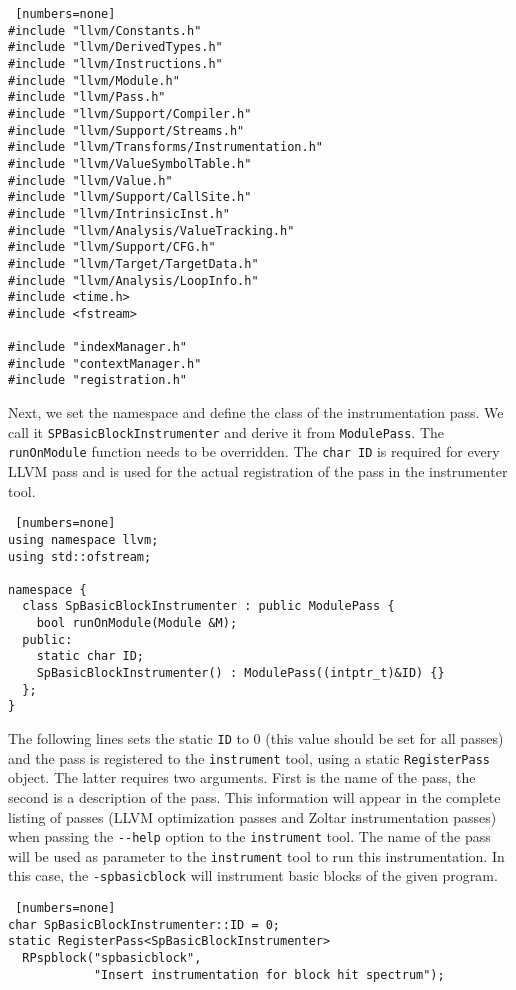 \begin{lstlisting} [numbers=none]
#include "llvm/Constants.h"
#include "llvm/DerivedTypes.h"
#include "llvm/Instructions.h"
#include "llvm/Module.h"
#include "llvm/Pass.h"
#include "llvm/Support/Compiler.h"
#include "llvm/Support/Streams.h"
#include "llvm/Transforms/Instrumentation.h"
#include "llvm/ValueSymbolTable.h"
#include "llvm/Value.h"
#include "llvm/Support/CallSite.h"
#include "llvm/IntrinsicInst.h"
#include "llvm/Analysis/ValueTracking.h"
#include "llvm/Support/CFG.h"
#include "llvm/Target/TargetData.h"
#include "llvm/Analysis/LoopInfo.h"
#include <time.h>
#include <fstream>

#include "indexManager.h"
#include "contextManager.h"
#include "registration.h"
\end{lstlisting}

Next, we set the namespace and define the class of the instrumentation pass.
We call it \texttt{SPBasicBlockInstrumenter} and derive it from \texttt{ModulePass}.
The \texttt{runOnModule} function needs to be overridden.
The \texttt{char ID} is required for every LLVM pass and is used
for the actual registration of the pass in the instrumenter tool.

\begin{lstlisting} [numbers=none]
using namespace llvm;
using std::ofstream;

namespace {
  class SpBasicBlockInstrumenter : public ModulePass {
    bool runOnModule(Module &M);
  public:
    static char ID;
    SpBasicBlockInstrumenter() : ModulePass((intptr_t)&ID) {}
  };
}
\end{lstlisting}

The following lines sets the static \verb|ID| to 0 (this value should be set for all passes)
and the pass is registered to the \texttt{instrument} tool, 
using a static \texttt{RegisterPass} object.
The latter requires two arguments.
First is the name of the pass,
the second is a description of the pass.
This information will appear in the complete listing of passes
(LLVM optimization passes and Zoltar instrumentation passes)
when passing the \verb|--help| option to the \texttt{instrument} tool.
The name of the pass will be used as parameter to the
\verb|instrument| tool to run this instrumentation.
In this case, the \texttt{-spbasicblock} will instrument
basic blocks of the given program.

\begin{lstlisting} [numbers=none]
char SpBasicBlockInstrumenter::ID = 0;
static RegisterPass<SpBasicBlockInstrumenter>
  RPspblock("spbasicblock", 
            "Insert instrumentation for block hit spectrum");
\end{lstlisting}

